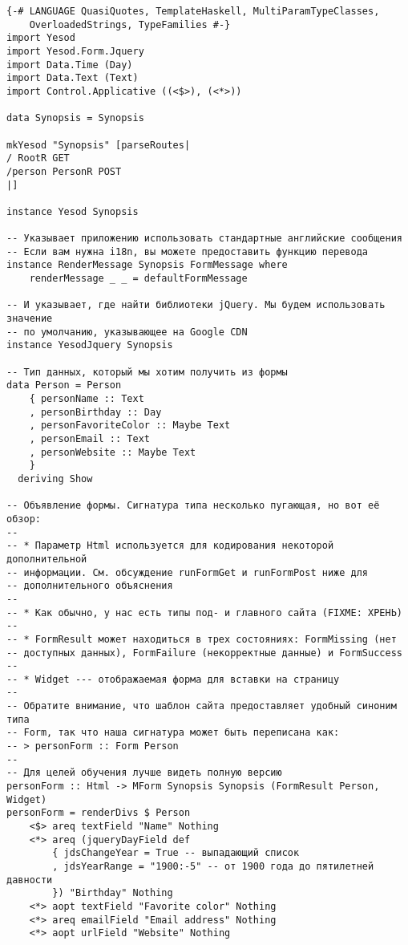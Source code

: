 \begin{lstlisting}
{-# LANGUAGE QuasiQuotes, TemplateHaskell, MultiParamTypeClasses,
    OverloadedStrings, TypeFamilies #-}
import Yesod
import Yesod.Form.Jquery
import Data.Time (Day)
import Data.Text (Text)
import Control.Applicative ((<$>), (<*>))

data Synopsis = Synopsis

mkYesod "Synopsis" [parseRoutes|
/ RootR GET
/person PersonR POST
|]

instance Yesod Synopsis

-- Указывает приложению использовать стандартные английские сообщения
-- Если вам нужна i18n, вы можете предоставить функцию перевода
instance RenderMessage Synopsis FormMessage where
    renderMessage _ _ = defaultFormMessage

-- И указывает, где найти библиотеки jQuery. Мы будем использовать значение
-- по умолчанию, указывающее на Google CDN
instance YesodJquery Synopsis

-- Тип данных, который мы хотим получить из формы
data Person = Person
    { personName :: Text
    , personBirthday :: Day
    , personFavoriteColor :: Maybe Text
    , personEmail :: Text
    , personWebsite :: Maybe Text
    }
  deriving Show

-- Объявление формы. Сигнатура типа несколько пугающая, но вот её обзор:
--
-- * Параметр Html используется для кодирования некоторой дополнительной
-- информации. См. обсуждение runFormGet и runFormPost ниже для 
-- дополнительного объяснения
--
-- * Как обычно, у нас есть типы под- и главного сайта (FIXME: ХРЕНЬ)
--
-- * FormResult может находиться в трех состояниях: FormMissing (нет
-- доступных данных), FormFailure (некорректные данные) и FormSuccess
--
-- * Widget --- отображаемая форма для вставки на страницу
--
-- Обратите внимание, что шаблон сайта предоставляет удобный синоним типа
-- Form, так что наша сигнатура может быть переписана как:
-- > personForm :: Form Person
--
-- Для целей обучения лучше видеть полную версию
personForm :: Html -> MForm Synopsis Synopsis (FormResult Person, Widget)
personForm = renderDivs $ Person
    <$> areq textField "Name" Nothing
    <*> areq (jqueryDayField def
        { jdsChangeYear = True -- выпадающий список
        , jdsYearRange = "1900:-5" -- от 1900 года до пятилетней давности
        }) "Birthday" Nothing
    <*> aopt textField "Favorite color" Nothing
    <*> areq emailField "Email address" Nothing
    <*> aopt urlField "Website" Nothing


\end{lstlisting}
